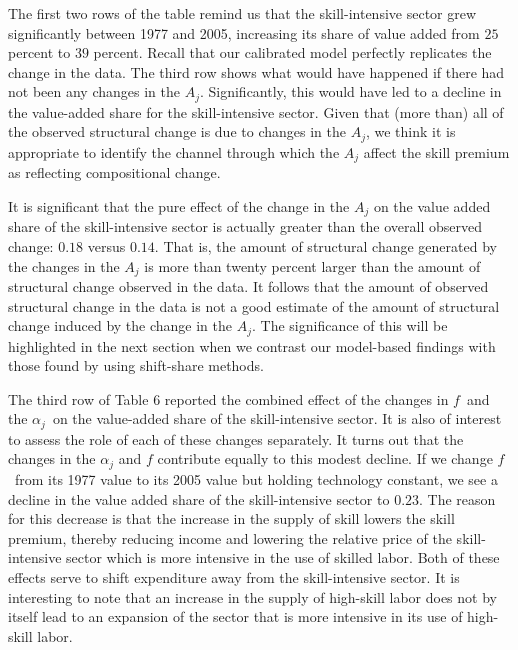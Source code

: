 \documentclass[12pt,english]{article}
\begin{document}
{\normalsize The first two rows of the table remind us that the
skill-intensive sector grew significantly between 1977 and 2005, increasing
its share of value added from $25$ percent to $39$ percent. Recall that our
calibrated model perfectly replicates the change in the data. The third row
shows what would have happened if there had not been any changes in the $%
A_{j}$. Significantly, this would have led to a decline in the value-added
share for the skill-intensive sector. Given that (more than) all of the
observed structural change is due to changes in the $A_{j}$, we think it is
appropriate to identify the channel through which the $A_{j}$ affect the
skill premium as reflecting compositional change. }

{\normalsize It is significant that the pure effect of the change in the $%
A_{j}$ on the value added share of the skill-intensive sector is actually
greater than the overall observed change: $0.18$ versus $0.14$. That is, the
amount of structural change generated by the changes in the $A_{j}$ is more
than twenty percent larger than the amount of structural change observed in
the data. It follows that the amount of observed structural change in the
data is not a good estimate of the amount of structural change induced by
the change in the $A_{j}$. The significance of this will be highlighted in
the next section when we contrast our model-based findings with those found
by \citet{KatMur92} using shift-share methods. }

{\normalsize The third row of Table 6 reported the combined effect of the
changes in $f$\ and the $\alpha _{j}$\ on the value-added share of the
skill-intensive sector. It is also of interest to assess the role of each of
these changes separately. It turns out that the changes in the $\alpha _{j}$
and $f$ contribute equally to this modest decline. If we change $f$\ from
its 1977 value to its 2005 value but holding technology constant, we see a
decline in the value added share of the skill-intensive sector to $0.23$.
The reason for this decrease is that the increase in the supply of skill
lowers the skill premium, thereby reducing income and lowering the relative
price of the skill-intensive sector which is more intensive in the use of
skilled labor. Both of these effects serve to shift expenditure away from
the skill-intensive sector. It is interesting to note that an increase in
the supply of high-skill labor does not by itself lead to an expansion of
the sector that is more intensive in its use of high-skill labor. }
\end{document}
